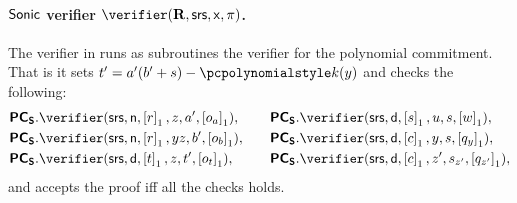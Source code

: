 \documentclass[runningheads,11pt]{llncs}
\theoremstyle{definition} \newtheorem{definition}[theorem]{Definition}
\begin{document}
\paragraph{${\textnormal{\textsf{Sonic}}}$ verifier $\verifier(\REL, \srs, \inp, \zkproof)$.} The verifier
in \sonic{} runs as subroutines the verifier for the polynomial commitment. That
is it sets $t' = a'(b' + s) - \p{k}(y)$ and checks the following:
\begin{equation*}
  \begin{split}
    &\PCOMs.\verifier(\srs, \multconstr, \gone{r}, z, a', \gone{o_a}), \\
    &\PCOMs.\verifier(\srs, \multconstr, \gone{r}, yz, b', \gone{o_b}),\\
    &\PCOMs.\verifier(\srs, \dconst, \gone{t}, z, t', \gone{o_t}),\\
  \end{split}
  \qquad
  \begin{split}
    &\PCOMs.\verifier(\srs, \dconst, \gone{s}, u, s, \gone{w}),\\
    &\PCOMs.\verifier(\srs, \dconst, \gone{c}, y, s, \gone{q_y}),\\
    &\PCOMs.\verifier(\srs, \dconst, \gone{c}, z', s_{z'}, \gone{q_{z'}}),
  \end{split}
\end{equation*}
and accepts the proof iff all the checks holds.
\end{document}
